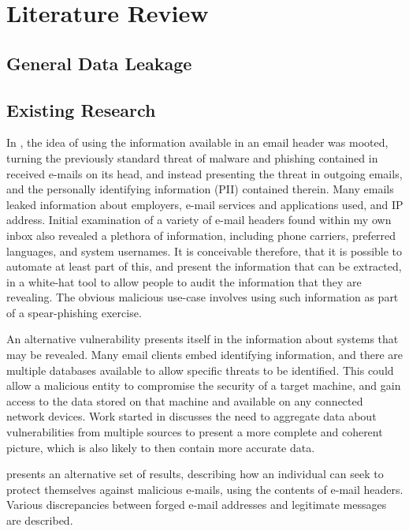 \chapter{Literature Review}\label{chap:exres}
\section{General Data Leakage}

\section{Existing Research}
In \cite{nurse2015investigating}, the idea of using the information available in an email header was mooted, turning the previously standard threat of malware and phishing contained in received e-mails on its head, and instead presenting the threat in outgoing emails, and the personally identifying information (PII) contained therein.  Many emails leaked information about employers, e-mail services and applications used, and IP address.  Initial examination of a variety of e-mail headers found within my own inbox also revealed a plethora of information, including phone carriers, preferred languages, and system usernames.  It is conceivable therefore, that it is possible to automate at least part of this, and present the information that can be extracted, in a white-hat tool to allow people to audit the information that they are revealing.  The obvious malicious use-case involves using such information as part of a spear-phishing exercise.

An alternative vulnerability presents itself in the information about systems that may be revealed.  Many email clients embed identifying information, and there are multiple databases available to allow specific threats to be identified.  This could allow a malicious entity to compromise the security of a target machine, and gain access to the data stored on that machine and available on any connected network devices.  Work started in \cite{joshi2013extracting} discusses the need to aggregate data about vulnerabilities from multiple sources to present a more complete and coherent picture, which is also likely to then contain more accurate data.

\cite{Al-zarouni_tracinge-mail} presents an alternative set of results, describing how an individual can seek to protect themselves against malicious e-mails, using the contents of e-mail headers.  Various discrepancies between forged e-mail addresses and legitimate messages are described.

